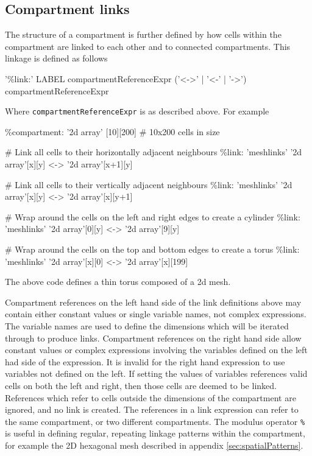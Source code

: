 \subsection{Compartment links}

The structure of a compartment is further defined by how cells within the compartment are linked to each other and to connected compartments. This linkage is defined as follows
\begin{bnfsource}
'\%link:' LABEL compartmentReferenceExpr ('<->' | '<-' | '->') compartmentReferenceExpr
\end{bnfsource}
Where \verb|compartmentReferenceExpr| is as described above. For example
\begin{kappasource}
\%compartment: '2d array' [10][200]    # 10x200 cells in size 

# Link all cells to their horizontally adjacent neighbours
\%link: 'meshlinks' '2d array'[x][y] <-> '2d array'[x+1][y]

# Link all cells to their vertically adjacent neighbours
\%link: 'meshlinks' '2d array'[x][y] <-> '2d array'[x][y+1]

# Wrap around the cells on the left and right edges to create a cylinder
\%link: 'meshlinks' '2d array'[0][y] <-> '2d array'[9][y]

# Wrap around the cells on the top and bottom edges to create a torus
\%link: 'meshlinks' '2d array'[x][0] <-> '2d array'[x][199]
\end{kappasource}

The above code defines a thin torus composed of a 2d mesh.

Compartment references on the left hand side of the link definitions above may contain either constant values or single variable names, not complex expressions. The variable names are used to define the dimensions which will be iterated through to produce links. Compartment references on the right hand side allow constant values or complex expressions involving the variables defined on the left had side of the expression. It is invalid for the right hand expression to use variables not defined on the left. If setting the values of variables references valid cells on both the left and right, then those cells are deemed to be linked. References which refer to cells outside the dimensions of the compartment are ignored, and no link is created. The references in a link expression can refer to the same compartment, or two different compartments. The modulus operator \verb|%| is useful in defining regular, repeating linkage patterns within the compartment, for example the 2D hexagonal mesh described in appendix \ref{sec:spatialPatterns}.

